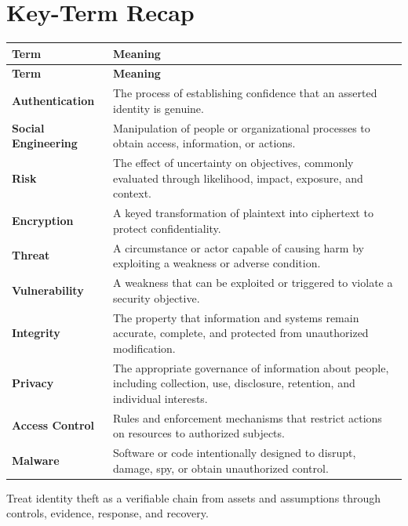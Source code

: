 \documentclass[11pt]{article}
\begin{document}
\section*{Key-Term Recap}
\begin{longtable}{>{\RaggedRight\arraybackslash}p{}>{\RaggedRight\arraybackslash}p{}}
\toprule\rowcolor{Navy}\color{white}\textbf{Term} & \color{white}\textbf{Meaning}\\\midrule
\endfirsthead
\toprule\rowcolor{Navy}\color{white}\textbf{Term} & \color{white}\textbf{Meaning}\\\midrule
\endhead
\textbf{Authentication} & The process of establishing confidence that an asserted identity is genuine. \\\midrule
\textbf{Social Engineering} & Manipulation of people or organizational processes to obtain access, information, or actions. \\\midrule
\textbf{Risk} & The effect of uncertainty on objectives, commonly evaluated through likelihood, impact, exposure, and context. \\\midrule
\textbf{Encryption} & A keyed transformation of plaintext into ciphertext to protect confidentiality. \\\midrule
\textbf{Threat} & A circumstance or actor capable of causing harm by exploiting a weakness or adverse condition. \\\midrule
\textbf{Vulnerability} & A weakness that can be exploited or triggered to violate a security objective. \\\midrule
\textbf{Integrity} & The property that information and systems remain accurate, complete, and protected from unauthorized modification. \\\midrule
\textbf{Privacy} & The appropriate governance of information about people, including collection, use, disclosure, retention, and individual interests. \\\midrule
\textbf{Access Control} & Rules and enforcement mechanisms that restrict actions on resources to authorized subjects. \\\midrule
\textbf{Malware} & Software or code intentionally designed to disrupt, damage, spy, or obtain unauthorized control. \\\midrule
\bottomrule
\end{longtable}
\begin{takeawaybox}
Treat identity theft as a verifiable chain from assets and assumptions through controls, evidence, response, and recovery.
\end{takeawaybox}
\end{document}
